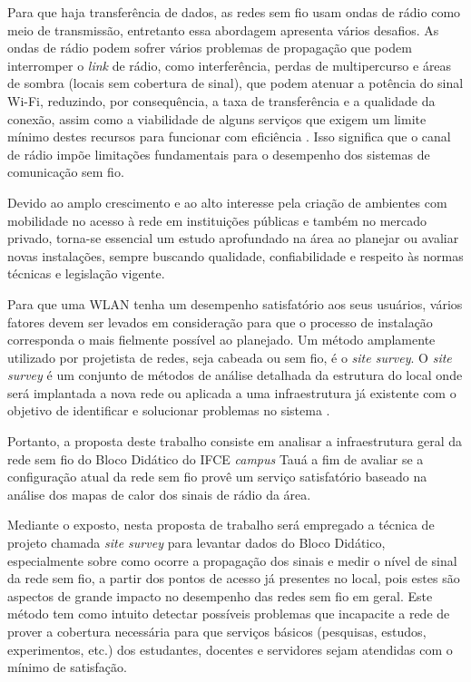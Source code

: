 Para que haja transferência de dados, as redes sem fio usam ondas de rádio como meio de transmissão, entretanto essa abordagem apresenta vários desafios. As ondas de rádio podem sofrer vários problemas de propagação que podem interromper o \textit{link} de rádio, como interferência, perdas de multipercurso e áreas de sombra (locais sem cobertura de sinal), que podem atenuar a potência do sinal Wi-Fi, reduzindo, por consequência, a taxa de transferência e a qualidade da conexão, assim como a viabilidade de alguns serviços que exigem um limite mínimo destes recursos para funcionar com eficiência
 \cite{gast2002}. Isso significa que o canal de rádio impõe limitações fundamentais para o desempenho dos sistemas de comunicação sem fio.
 
Devido ao amplo crescimento e ao alto interesse pela criação de ambientes com mobilidade no acesso à rede em instituições públicas e também no mercado privado, torna-se essencial um estudo aprofundado na área ao planejar ou avaliar novas instalações, sempre buscando qualidade, confiabilidade e respeito às normas técnicas e legislação vigente.

Para que uma WLAN tenha um desempenho satisfatório aos seus usuários, vários fatores devem ser levados em consideração para que o processo de instalação corresponda o mais fielmente possível ao planejado. Um método amplamente utilizado por projetista de redes, seja cabeada ou sem fio, é o \textit{site survey}. O \textit{site survey} é um conjunto de métodos de análise detalhada da estrutura do local onde será implantada a nova rede ou aplicada a uma infraestrutura já existente com o objetivo de identificar e solucionar problemas no sistema \cite{pinheiro2004site}.

Portanto, a proposta deste trabalho consiste em analisar a infraestrutura geral da rede sem fio do Bloco Didático do IFCE \textit{campus} Tauá a fim de avaliar se a configuração atual da rede sem fio provê um serviço satisfatório baseado na análise dos mapas de calor dos sinais de rádio da área.

Mediante o exposto, nesta proposta de trabalho será empregado a técnica de projeto chamada \textit{site survey} para levantar dados do Bloco Didático, especialmente sobre como ocorre a propagação dos sinais e medir o nível de sinal da rede sem fio, a partir dos pontos de acesso já presentes no local, pois estes são aspectos de grande impacto no desempenho das redes sem fio em geral.  Este método tem como intuito detectar possíveis problemas que incapacite a rede de prover a cobertura necessária para que serviços básicos (pesquisas, estudos, experimentos, etc.) dos estudantes, docentes e servidores sejam atendidas com o mínimo de satisfação.

